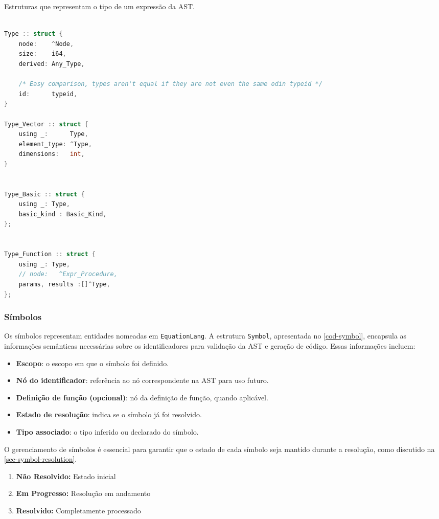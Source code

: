 \begin{codigo}[htb]
    \caption{\small Estruturas que representam o tipo de um expressão da AST. }
    \label{cod-types-structs}
\begin{lstlisting}[language=C, numbers=none, frame=none, inputencoding=latin1]

Type :: struct {
    node:    ^Node,
    size:    i64,
    derived: Any_Type,

    /* Easy comparison, types aren't equal if they are not even the same odin typeid */
    id:      typeid,
}

Type_Vector :: struct {
    using _:      Type,
    element_type: ^Type,
    dimensions:   int,
}


Type_Basic :: struct {
    using _: Type,
    basic_kind : Basic_Kind,
};


Type_Function :: struct {
    using _: Type,
    // node:   ^Expr_Procedure,
    params, results :[]^Type,
};

\end{lstlisting}
\end{codigo}


\subsubsection{Símbolos}

Os símbolos representam entidades nomeadas em \texttt{EquationLang}. A estrutura \texttt{Symbol}, apresentada no \autoref{cod-symbol}, encapsula as informações semânticas necessárias sobre os identificadores para validação da AST e geração de código. Essas informações incluem: \begin{itemize} \item \textbf{Escopo}: o escopo em que o símbolo foi definido. \item \textbf{Nó do identificador}: referência ao nó correspondente na AST para uso futuro. \item \textbf{Definição de função (opcional)}: nó da definição de função, quando aplicável. \item \textbf{Estado de resolução}: indica se o símbolo já foi resolvido. \item \textbf{Tipo associado}: o tipo inferido ou declarado do símbolo. \end{itemize}

O gerenciamento de símbolos é essencial para garantir que o estado de cada símbolo seja mantido durante a resolução, como discutido na \autoref{sec-symbol-resolution}.
\begin{enumerate}
    \item \textbf{Não Resolvido:} Estado inicial
    \item \textbf{Em Progresso:} Resolução em andamento
    \item \textbf{Resolvido:} Completamente processado
\end{enumerate}

